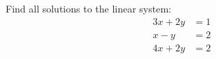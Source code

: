 Find all solutions to the linear system:
\begin{align*}
3x + 2y &= 1\\
x - y &= 2\\
4x + 2y &= 2
\end{align*}
